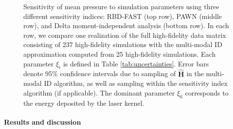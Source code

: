 \documentclass[preprint,10pt]{elsarticle}
\begin{document}
\begin{figure}[htbp]
    \caption{Sensitivity of mean pressure to simulation parameters using three different sensitivity indices: RBD-FAST \cite{tarantola2006random} (top row), PAWN \cite{pianosi2015simple} (middle row), and Delta moment-independent analysis \cite{plischke2013global} (bottom row). In each row, we compare one realization of the full high-fidelity data matrix consisting of 237 high-fidelity simulations with the multi-modal ID approximation computed from 25 high-fidelity simulations. Each parameter $\xi_i$ is defined in Table \ref{tab:uncertainties}. Error bars denote 95\% confidence intervals due to sampling of $\widehat{\bm H}$ in the multi-modal ID algorithm, as well as sampling within the sensitivity index algorithm (if applicable). The dominant parameter $\xi_6$ corresponds to the energy deposited by the laser kernel.}
    \label{fig:sens}

\end{figure}


\paragraph{Results and discussion}
\end{document}
